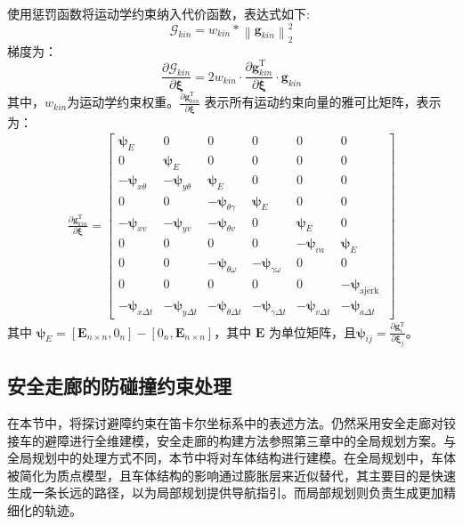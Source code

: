 \documentclass[master,academic]{ysuthesis} %
\begin{document}
		使用惩罚函数将运动学约束纳入代价函数，表达式如下:
		\begin{equation}
			\mathcal{G}_{kin} = w_{kin}*\left \| \bm{g}_{kin} \right \|_2^2 \label{Gkin}
		\end{equation}
		梯度为：
		\begin{equation}
			\frac{\partial\mathcal{G}_{kin}}{\partial\bm{\xi}}=2w_{kin}\cdot\frac{\partial \bm{g}_{kin}^{\mathrm{T}}}{\partial\bm{\xi}}\cdot \bm{g}_{kin}\label{18}
		\end{equation}
		其中，$w_{kin}$为运动学约束权重。\(\frac{\partial \bm{g}_{kin}^{\mathrm{T}}}{\partial \bm{\xi}}\) 表示所有运动约束向量的雅可比矩阵，表示为：
		\begin{equation}
			\begin{array}{c}
				\frac{\partial \bm{g}_{kin}^{\mathrm{T}}}{\partial \bm{\xi}}= 
				{\left[\begin{array}{cccccc}
						\bm{\psi}_{E} & 0 & 0 & 0 & 0 & 0 \\
						0 & \bm{\psi}_{E} & 0 & 0 & 0 & 0 \\
						-\bm{\psi}_{x \theta} & -\bm{\psi}_{y \theta} & \bm{\psi}_{E} & 0 & 0 & 0 \\
						0 & 0 & -\bm{\psi}_{\theta \gamma} & \bm{\psi}_{E} & 0 & 0 \\
						-\bm{\psi}_{x v} & -\bm{\psi}_{y v} & -\bm{\psi}_{\theta v} & 0 & \bm{\psi}_{E} & 0 \\
						0 & 0 & 0 & 0 & -\bm{\psi}_{v a} & \bm{\psi}_{E} \\
						0 & 0 & -\bm{\psi}_{\theta \omega} & -\bm{\psi}_{\gamma \omega} & 0 & 0 \\
						0 & 0 & 0 & 0 & 0 & -\bm{\psi}_{\text {ajerk }} \\
						-\bm{\psi}_{x \Delta t} & -\bm{\psi}_{y \Delta t} & -\bm{\psi}_{\theta \Delta t} & -\bm{\psi}_{\gamma \Delta t} & -\bm{\psi}_{v \Delta t} & -\bm{\psi}_{a \Delta t}
					\end{array}\right]}
			\end{array}
			\label{eq:运动学约束的雅可比}
		\end{equation}
		其中 $\bm{\psi}_E = [\bm{E}_{n \times n}, 0_n] - [0_n, \bm{E}_{n \times n}]$，其中 $\bm{E}$ 为单位矩阵，且\(\bm{\psi}_{ij} = \frac{\partial \bm{g}^{\mathrm{T}}_{i}}{\partial \bm{\xi}_j}\)。

		\subsection{安全走廊的防碰撞约束处理}
		在本节中，将探讨避障约束在笛卡尔坐标系中的表述方法。仍然采用安全走廊对铰接车的避障进行全维建模，安全走廊的构建方法参照第三章中的全局规划方案。与全局规划中的处理方式不同，本节中将对车体结构进行建模。在全局规划中，车体被简化为质点模型，且车体结构的影响通过膨胀层来近似替代，其主要目的是快速生成一条长远的路径，以为局部规划提供导航指引。而局部规划则负责生成更加精细化的轨迹。
\end{document}
